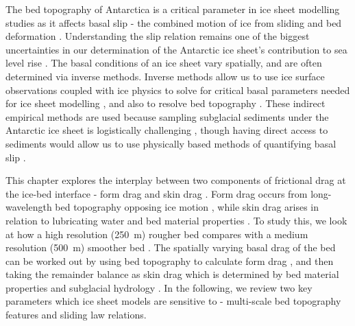 The bed topography of Antarctica is a critical parameter in ice sheet modelling studies as it affects basal slip - the combined motion of ice from sliding and bed deformation \citep[][p.223]{Cuffeyphysicsglaciers2010}.
Understanding the slip relation remains one of the biggest uncertainties in our determination of the Antarctic ice sheet's contribution to sea level rise \citep[e.g.][]{RitzPotentialsealevelrise2015,BulthuisUncertaintyquantificationmulticentennial2019}.
The basal conditions of an ice sheet vary spatially, and are often determined via inverse methods.
Inverse methods allow us to use ice surface observations coupled with ice physics to solve for critical basal parameters needed for ice sheet modelling \citep[e.g.][]{MacAyealbasalstressdistribution1992,JoughinBasalconditionsPine2009,MorlighemInversionbasalfriction2013}, and also to resolve bed topography \citep[e.g.][]{MorlighemDeepglacialtroughs2019,LeongDeepBedMapdeepneural2020}.
These indirect empirical methods are used because sampling subglacial sediments under the Antarctic ice sheet is logistically challenging \citep[e.g.][]{Siegertassessmentdeephotwater2014,TulaczykWISSARDSubglacialLake2014}, though having direct access to sediments would allow us to use physically based methods of quantifying basal slip \citep[e.g.][]{Zoetsliplawglaciers2020}.

This chapter explores the interplay between two components of frictional drag at the ice-bed interface - form drag and skin drag \citep{SchoofBasalperturbationsice2002,BinghamDiverselandscapesPine2017,Kyrke-SmithRelevanceDetailBasal2018,Minchewuniversalglacierslip2020}.
Form drag occurs from long-wavelength bed topography opposing ice motion \citep[][]{WeertmanSlidingGlaciers1957,SchoofBasalperturbationsice2002}, while skin drag arises in relation to lubricating water and bed material properties \citep{IversonExperimentsdynamicssedimentary2015}.
To study this, we look at how a high resolution (\SI{250}{\metre}) rougher bed \citep{LeongDeepBedMap2020} compares with a medium resolution (\SI{500}{\metre}) smoother bed \citep{MorlighemMEaSUREsBedMachineAntarctica2020}.
The spatially varying basal drag of the bed can be worked out by using bed topography to calculate form drag \citep{SchoofBasalperturbationsice2002}, and then taking the remainder balance as skin drag which is determined by bed material properties and subglacial hydrology \citep{Kyrke-SmithRelevanceDetailBasal2018}. %
In the following, we review two key parameters which ice sheet models are sensitive to - multi-scale bed topography features and sliding law relations.



